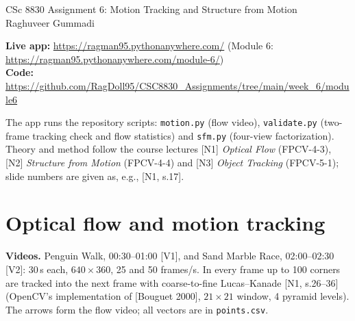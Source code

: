 \documentclass[10pt,letterpaper]{article}
\begin{document}
\begin{center}
{\Large CSc 8830 Assignment 6: Motion Tracking and Structure from Motion}\\[4pt]
Raghuveer Gummadi
\end{center}

\textbf{Live app:} \url{https://ragman95.pythonanywhere.com/} \quad (Module 6: \url{https://ragman95.pythonanywhere.com/module-6/})\\
\textbf{Code:} \url{https://github.com/RagDoll95/CSC8830_Assignments/tree/main/week_6/module6}

The app runs the repository scripts: \texttt{motion.py} (flow video), \texttt{validate.py}
(two-frame tracking check and flow statistics) and \texttt{sfm.py} (four-view factorization).
Theory and method follow the course lectures [N1] \emph{Optical Flow} (FPCV-4-3),
[N2] \emph{Structure from Motion} (FPCV-4-4) and [N3] \emph{Object Tracking} (FPCV-5-1);
slide numbers are given as, e.g., [N1, s.17].

\section{Optical flow and motion tracking}

\textbf{Videos.} Penguin Walk, 00:30--01:00 [V1], and Sand Marble Race, 02:00--02:30 [V2]:
30\,s each, $640\times360$, 25 and 50 frames/s. In every frame up to 100 corners are
tracked into the next frame with coarse-to-fine Lucas--Kanade [N1, s.26--36] (OpenCV's
implementation of [Bouguet 2000], $21\times21$ window, 4 pyramid levels). The arrows form
the flow video; all vectors are in \texttt{points.csv}.
\end{document}
